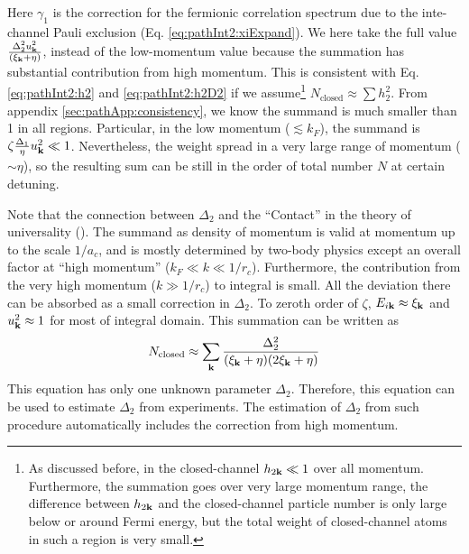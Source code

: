Here $\gamma_{1}$ is the correction for the fermionic correlation spectrum due to the inte-channel Pauli exclusion (Eq. \ref{eq:pathInt2:xiExpand}).  We here take the full value $\frac{\Delta_{2}^2u_{\mathbf{k}}^{2}}{(\xi_{\mathbf{k}}+\eta)}$, instead of the low-momentum value because the summation has substantial contribution from  high momentum.  This is consistent with Eq. \ref{eq:pathInt2:h2} and \ref{eq:pathInt2:h2D2} if we assume\footnote{As discussed before, in the closed-channel $h_{2\mathbf{k}}\ll1$ over all momentum.  Furthermore, the summation goes over very large momentum range, the difference between $h_{2\mathbf{k}}$ and the closed-channel particle number is only large below or around Fermi energy, but the total weight of closed-channel atoms  in such a region is very small.  }  $N_{\text{closed}}\approx\sum{h_{2}^{2}}$.    From appendix \ref{sec:pathApp:consistency}, we know the summand is much smaller than 1 in all regions. Particular, in the low momentum ($\lesssim{}k_{F}$), the summand is $\zeta\frac{\Delta_{1}}{\eta}u_{\mathbf{k}}^{2}\ll1$. Nevertheless, the weight spread in a very large range of momentum ($\sim\eta$), so the resulting sum can be still in the order of total number $N$ at certain detuning. 

Note that the connection between $\Delta_{2}$ and the ``Contact'' in the theory of universality (\cite{Tan2008-1,Tan2008-2}).  The summand as  density of momentum is valid at momentum up to the scale $1/a_{c}$, and is mostly determined by two-body physics except an overall factor at ``high momentum'' ($k_{F}\ll{}k\ll{}1/r_{c}$).  Furthermore, the contribution from the very high momentum ($k\gg1/r_{c}$) to integral is small.  All the deviation there can be absorbed as a small correction in $\Delta_{2}$.  To zeroth order of $\zeta$, $E_{i\mathbf{k}}\approx\xi_{\mathbf{k}}$ and $u_{\mathbf{k}}^2\approx1$ for most of integral domain.  This summation can be written as 
\begin{equation}\label{eq:pathInt2:closeD2}
N_{\text{closed}}\approx\sum_{\mathbf{k}}\frac{\Delta_{2}^2}{(\xi_{\mathbf{k}}+\eta)(2\xi_{\mathbf{k}}+\eta)}
\end{equation}
This equation has only one unknown parameter $\Delta_{2}$.  Therefore, this equation can be used to estimate $\Delta_{2}$ from experiments.  The  estimation of  $\Delta_{2}$ from such procedure automatically includes the correction from  high momentum. 


